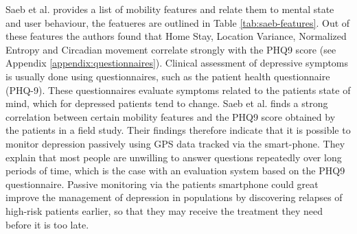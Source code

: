 Saeb et al. provides a list of mobility features and relate them to mental state and user behaviour, the featueres are outlined in Table \ref{tab:saeb-features}. Out of these features the authors found that Home Stay, Location Variance, Normalized Entropy and Circadian movement correlate strongly with the PHQ9 score (see Appendix \ref{appendix:questionnaires}). Clinical assessment of depressive symptoms is usually done using questionnaires, such as the patient health questionnaire (PHQ-9). These questionnaires evaluate symptoms related to the patients state of mind, which for depressed patients tend to change. Saeb et al. finds a strong correlation between certain mobility features and the PHQ9 score obtained by the patients in a field study. Their findings therefore indicate that it is possible to monitor depression passively using GPS data tracked via the smart-phone. They explain that most people are unwilling to answer questions repeatedly over long periods of time, which is the case with an evaluation system based on the PHQ9 questionnaire. Passive monitoring via the patients smartphone could great improve the management of depression in populations by discovering relapses of high-risk patients earlier, so that they may receive the treatment they need before it is too late. \\

